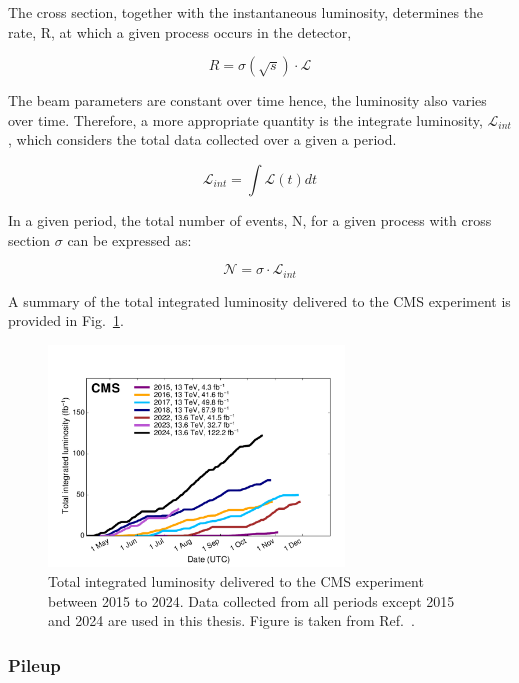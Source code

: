 The cross section, together with the instantaneous luminosity, determines the rate, R, at which a given process occurs in the detector,

\begin{equation}
    R = \sigma(\sqrt{s}) \cdot \mathscr{L} 
\end{equation}

The beam parameters are constant over time hence, the luminosity also varies over time. Therefore, a more appropriate quantity is the integrate luminosity, $\mathscr{L}_{int}$, which considers the total data collected over a given a period.

\begin{equation}
    \mathscr{L}_{int} = \int \mathscr{L}(t) dt
\end{equation}

In a given period, the total number of events, N, for a given process with cross section $\sigma$ can be expressed as:

\begin{equation}
    \mathscr{N} = \sigma \cdot \mathscr{L}_{int}
\end{equation}

A summary of the total integrated luminosity delivered to the CMS experiment is provided in Fig.~\ref{Figure:Chapter3_CMS_IntegratedLumi}.

\begin{figure}[h]
\centering
\includegraphics[width= 0.7\textwidth]{Figures/Chapter3/CMS_IntegratedLumi.pdf}
\caption{Total integrated luminosity delivered to the CMS experiment between 2015 to 2024. Data collected from all periods except 2015 and 2024 are used in this thesis. Figure is taken from Ref.~\cite{CMS_IntegratedLumi}.}
\label{Figure:Chapter3_CMS_IntegratedLumi}
\end{figure}

\subsubsection{Pileup}

